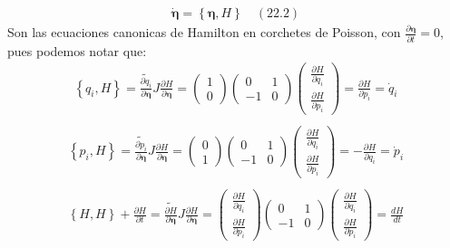 \documentclass[a4paper]{article}
\begin{document}
\begin{answer}[Punto 22]
        \begin{align*}
            \dot {\pmb \eta} = \left\{\pmb \eta, H\right\} \quad (22.2)
        \end{align*}
        Son las ecuaciones canonicas de Hamilton en corchetes de Poisson, con $\frac{\partial \pmb \eta}{\partial t} =0$, pues podemos notar que:
        \begin{align*}
            \left\{q_i, H \right\} = \tilde{\frac{\partial  q_i}{\partial \pmb \eta}} J \frac{\partial H}{\partial \pmb \eta} = \begin{pmatrix} 1 \\ 0 \end{pmatrix} \begin{pmatrix} 0 & 1 \\ -1 & 0 \end{pmatrix} \begin{pmatrix} \frac{\partial H}{\partial q_i} \\ \frac{\partial H}{\partial p_i} \end{pmatrix} = \frac{\partial H}{\partial p_i} = \dot q_i\\
        \end{align*}
        \begin{align*}
            \left\{p_i, H \right\} = \tilde{\frac{\partial  p_i}{\partial \pmb \eta}} J \frac{\partial H}{\partial \pmb \eta} = \begin{pmatrix} 0 \\ 1 \end{pmatrix} \begin{pmatrix} 0 & 1 \\ -1 & 0 \end{pmatrix} \begin{pmatrix} \frac{\partial H}{\partial q_i} \\ \frac{\partial H}{\partial p_i} \end{pmatrix} = -\frac{\partial H}{\partial q_i} = \dot p_i\\
        \end{align*}
        \begin{align*}
            \left\{H, H \right\} + \frac{\partial H}{\partial t}= \tilde{\frac{\partial  H}{\partial \pmb \eta}} J \frac{\partial H}{\partial \pmb \eta} = \begin{pmatrix} \frac{\partial H}{\partial q_i} \\ \frac{\partial H}{\partial p_i} \end{pmatrix} \begin{pmatrix} 0 & 1 \\ -1 & 0 \end{pmatrix} \begin{pmatrix} \frac{\partial H}{\partial q_i} \\ \frac{\partial H}{\partial p_i} \end{pmatrix} = \frac{d H}{d t}
        \end{align*}
    \end{answer}
    
\end{document}
